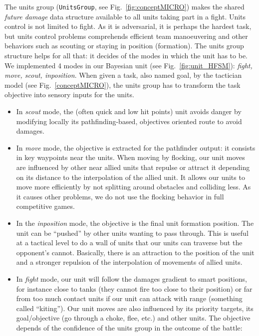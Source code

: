 \label{section:unitsgroup}
The units group (\texttt{UnitsGroup}, see Fig.~\ref{fig:conceptMICRO}) makes the shared \textit{future damage} data structure available to all units taking part in a fight. Units control is not limited to fight. As it is adversarial, it is perhaps the hardest task, but units control problems comprehends efficient team manoeuvering and other behaviors such as scouting or staying in position (formation). The units group structure helps for all that: it decides of the modes in which the unit has to be. We implemented 4 modes in our Bayesian unit (see Fig.~\ref{fig:unit_HFSM}): \textit{fight, move, scout, inposition}. When given a task, also named goal, by the tactician model (see Fig.~\ref{conceptMICRO}), the units group has to transform the task objective into sensory inputs for the units. 
\begin{itemize}
    \item In \textit{scout} mode, the (often quick and low hit points) unit avoids danger by modifying locally its pathfinding-based, objectives oriented route to avoid damages.
    \item In \textit{move} mode, the objective is extracted for the pathfinder output: it consists in key waypoints near the units. When moving by flocking, our unit moves are influenced by other near allied units that repulse or attract it depending on its distance to the interpolation of the allied unit. It allows our units to move more efficiently by not splitting around obstacles and colliding less. As it causes other problems, we do not use the flocking behavior in full competitive games.
    \item In the \textit{inposition} mode, the objective is the final unit formation position. The unit can be ``pushed'' by other units wanting to pass through. This is useful at a tactical level to do a wall of units that our units can traverse but the opponent's cannot. Basically, there is an attraction to the position of the unit and a stronger repulsion of the interpolation of movements of allied units.
    \item In \textit{fight} mode, our unit will follow the damages gradient to smart positions, for instance close to tanks (they cannot fire too close to their position) or far from too much contact units if our unit can attack with range (something called ``kiting''). Our unit moves are also influenced by its priority targets, its goal/objective (go through a choke, flee, etc.) and other units. The objective depends of the confidence of the units group in the outcome of the battle:

\end{itemize}

